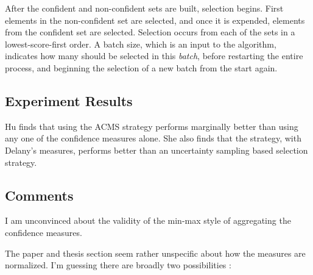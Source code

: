 \documentclass[a4paper,11pt]{report}
\begin{document}
After the confident and non-confident sets are built, selection begins. First elements in the non-confident set are selected, and once it is expended, elements from the confident set are selected. Selection occurs from each of the sets in a lowest-score-first order. A batch size, which is an input to the algorithm, indicates how many should be selected in this \emph{batch}, before restarting the entire process, and beginning the selection of a new batch from the start again.

\subsection{Experiment Results}
Hu finds that using the ACMS strategy performs marginally better than using any one of the confidence measures alone. She also finds that the strategy, with Delany's measures, performs better than an uncertainty sampling based selection strategy.


\subsection{Comments\label{sec:hu2comments}}
I am unconvinced about the validity of the min-max style of aggregating the confidence measures.

The paper and thesis section seem rather unspecific about how the measures are normalized. I'm guessing there are broadly two possibilities :
\end{document}
